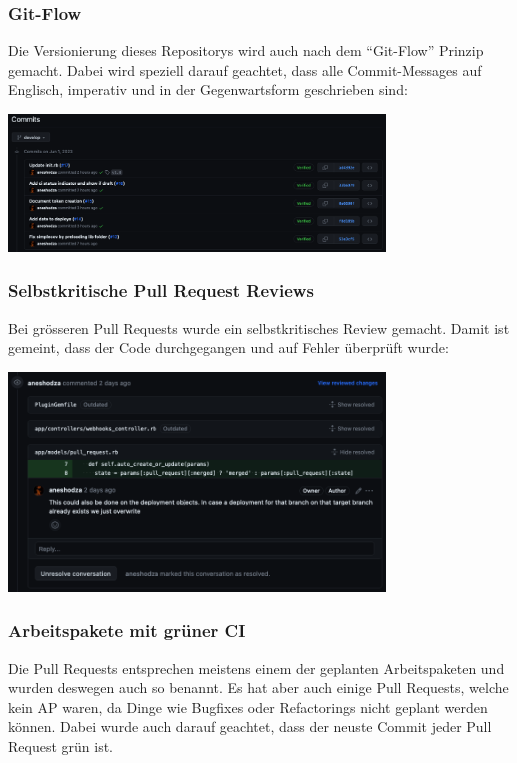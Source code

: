 \subsubsection{Git-Flow}
Die Versionierung dieses Repositorys wird auch nach dem \enquote{Git-Flow} Prinzip gemacht. Dabei wird
speziell darauf geachtet, dass alle Commit-Messages auf Englisch, imperativ und in der Gegenwartsform
geschrieben sind: 
\begin{center}
    \includegraphics[width=0.75\textwidth]{images/misc/git_commit_message.png}
    \label{fig:git_commit_message}
\end{center}
\subsubsection{Selbstkritische Pull Request Reviews}
Bei grösseren Pull Requests wurde ein selbstkritisches Review gemacht. Damit ist gemeint, dass der Code durchgegangen
und auf Fehler überprüft wurde:
\begin{center}
    \includegraphics[width=0.75\textwidth]{images/misc/git_pr_review.png}
    \label{fig:git_pr_review}
\end{center}
\subsubsection{Arbeitspakete mit \gls{grün}er CI}
Die Pull Requests entsprechen meistens einem der geplanten Arbeitspaketen und wurden deswegen auch so benannt. Es hat
aber auch einige Pull Requests, welche kein AP waren, da Dinge wie Bugfixes oder Refactorings nicht geplant
werden können. \newline
Dabei wurde auch darauf geachtet, dass der neuste Commit jeder Pull Request grün ist.


